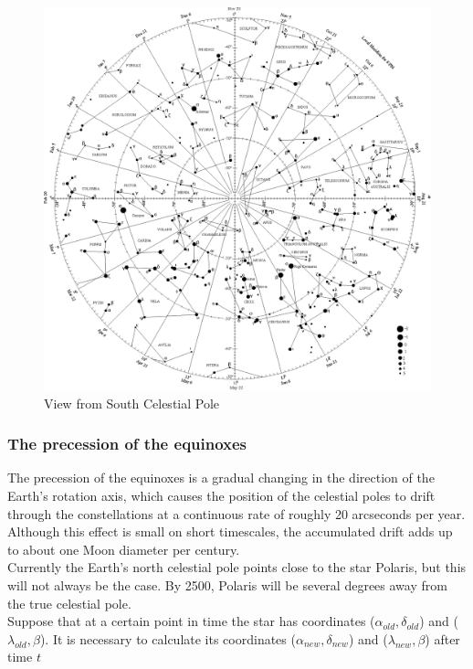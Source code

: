 \documentclass[a4paper,12pt]{extarticle}
\begin{document}
\begin{figure}[H]
    \centering
    \includegraphics[width=0.9 \linewidth]{scp_view.eps}
    \caption{View from South Celestial Pole}
\end{figure}

\subsubsection{The precession of the equinoxes}

The precession of the equinoxes is a gradual changing in the direction of the Earth’s rotation axis, which causes the position of the celestial poles to drift through the constellations at a continuous rate of roughly 20 arcseconds per year. Although this effect is small on short timescales, the accumulated drift adds up to about one Moon diameter per century.\\

Currently the Earth’s north celestial pole points close to the star Polaris, but this will not always be the case. By 2500, Polaris will be several degrees away from the true celestial pole.\\

Suppose that at a certain point in time the star has coordinates ($\alpha_{old}, \delta_{old}$) and ($\lambda_{old}, \beta$). It is necessary to calculate its coordinates ($\alpha_{new}, \delta_{new}$) and ($\lambda_{new}, \beta$) after time $t$ 
\end{document}
